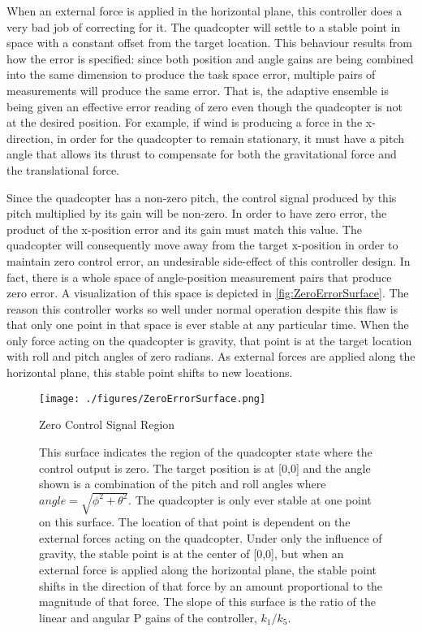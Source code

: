 \documentclass[letterpaper,12pt,titlepage,oneside,final]{book}
\begin{document}
When an external force is applied in the horizontal plane, this controller does a very bad job of correcting for it. 
The quadcopter will settle to a stable point in space with a constant offset from the target location. 
This behaviour results from how the error is specified:
since both position and angle gains are being combined into the same dimension to produce the task space error, multiple pairs of measurements will produce the same error. 
That is, the adaptive ensemble is being given an effective error reading of zero even though the quadcopter is not at the desired position. 
For example, if wind is producing a force in the x-direction, in order for the quadcopter to remain stationary, it must have a pitch angle that allows its thrust to compensate for both the gravitational force and the translational force.


Since the quadcopter has a non-zero pitch, the control signal produced by this pitch multiplied by its gain will be non-zero. 
In order to have zero error, the product of the x-position error and its gain must match this value. 
The quadcopter will consequently move away from the target x-position in order to maintain zero control error, an undesirable side-effect of this controller design. 
In fact, there is a whole space of angle-position measurement pairs that produce zero error.
A visualization of this space is depicted in \autoref{fig:ZeroErrorSurface}. 
The reason this controller works so well under normal operation despite this flaw is that only one point in that space is ever stable at any particular time. 
When the only force acting on the quadcopter is gravity, that point is at the target location with roll and pitch angles of zero radians. 
As external forces are applied along the horizontal plane, this stable point shifts to new locations.

\begin{figure}
\centering
\texttt{[image: ./figures/ZeroErrorSurface.png]} %
\caption{Zero Control Signal Region}
\label{fig:ZeroErrorSurface}
\captionsetup{singlelinecheck=off,font=footnotesize}
\caption*{
This surface indicates the region of the quadcopter state where the control output is zero.
The target position is at [0,0] and the angle shown is a combination of the pitch and roll angles where $angle = \sqrt{\phi^{2} + \theta^{2}}$.
The quadcopter is only ever stable at one point on this surface.
The location of that point is dependent on the external forces acting on the quadcopter.
Under only the influence of gravity, the stable point is at the center of [0,0], but when an external force is applied along the horizontal plane, the stable point shifts in the direction of that force by an amount proportional to the magnitude of that force.
The slope of this surface is the ratio of the linear and angular P gains of the controller, $k_{1}/k_{5}$.}
\end{figure}
\end{document}
